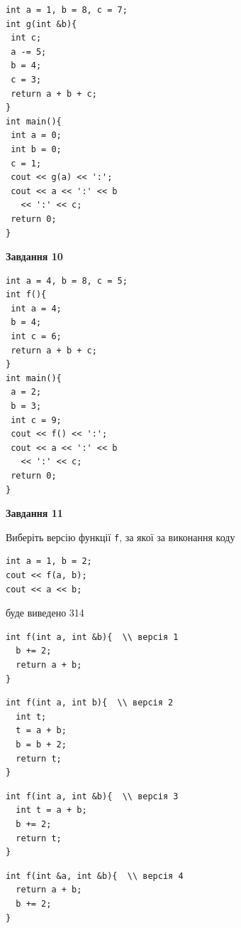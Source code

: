 \documentclass[12pt, ukrainian]{article}
\def\code#1{\Verb!#1!}
\begin{document}
{\begin {large}
\begin{minipage}[t]{7.0cm}
\begin{verbatim}
int a = 1, b = 8, c = 7;
int g(int &b){
 int c;
 a -= 5;
 b = 4;
 c = 3;
 return a + b + c;
}
int main(){
 int a = 0;
 int b = 0;
 c = 1;
 cout << g(a) << ':';
 cout << a << ':' << b 
   << ':' << c;
 return 0;
}
\end{verbatim}



\begin{center}
\textbf{Завдання 10}
\end{center}
\vspace{-8mm}

\begin{verbatim}
int a = 4, b = 8, c = 5;
int f(){
 int a = 4;
 b = 4;
 int c = 6;
 return a + b + c;
}
int main(){
 a = 2;
 b = 3;
 int c = 9;
 cout << f() << ':';
 cout << a << ':' << b 
   << ':' << c;
 return 0;
}
\end{verbatim}

\end{minipage}
\vline \hspace{1mm}
\begin{minipage}[t]{11.0cm}

\begin{center}
\textbf{Завдання 11}
\end{center}
Виберіть версію функції \code{f}, за якої за виконання коду
\begin{verbatim}
int a = 1, b = 2;
cout << f(a, b);
cout << a << b;
\end{verbatim}

буде виведено 314

\begin{verbatim}
int f(int a, int &b){  \\ версія 1
  b += 2;
  return a + b;
}
\end{verbatim}

\vspace{-8mm}\begin{verbatim}
int f(int a, int b){  \\ версія 2
  int t;
  t = a + b;
  b = b + 2;
  return t;
}
\end{verbatim}

\vspace{-8mm}\begin{verbatim}
int f(int a, int &b){  \\ версія 3
  int t = a + b;
  b += 2;
  return t;
}
\end{verbatim}

\vspace{-8mm}\begin{verbatim}
int f(int &a, int &b){  \\ версія 4
  return a + b;
  b += 2;
}
\end{verbatim}




\end{minipage}
\end{large}}
\end{document}
